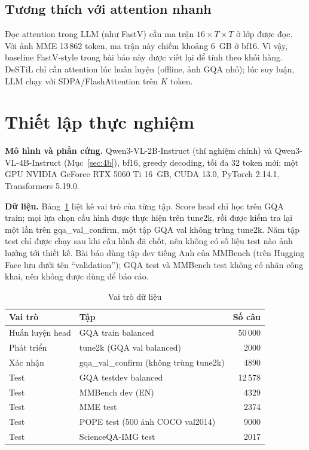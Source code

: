 \documentclass[conference]{IEEEtran}
\begin{document}
\subsection{Tương thích với attention nhanh}
Đọc attention trong LLM (như FastV) cần ma trận $16\times T\times T$ ở lớp được đọc. Với ảnh MME 13\,862 token, ma trận này chiếm khoảng 6~GB ở bf16. Vì vậy, baseline FastV-style trong bài báo này được viết lại để tính theo khối hàng. DeSTiL chỉ cần attention lúc huấn luyện (offline, ảnh GQA nhỏ); lúc suy luận, LLM chạy với SDPA/FlashAttention trên $K$ token.

\section{Thiết lập thực nghiệm}
\label{sec:setup}

\textbf{Mô hình và phần cứng.} Qwen3-VL-2B-Instruct (thí nghiệm chính) và Qwen3-VL-4B-Instruct (Mục~\ref{sec:4b}), bf16, greedy decoding, tối đa 32 token mới; một GPU NVIDIA GeForce RTX 5060 Ti 16~GB, CUDA 13.0, PyTorch 2.14.1, Transformers 5.19.0.

\textbf{Dữ liệu.} Bảng~\ref{tab:data} liệt kê vai trò của từng tập. Score head chỉ học trên GQA train; mọi lựa chọn cấu hình được thực hiện trên tune2k, rồi được kiểm tra lại một lần trên gqa\_val\_confirm, một tập GQA val không trùng tune2k. Năm tập test chỉ được chạy sau khi cấu hình đã chốt, nên không có số liệu test nào ảnh hưởng tới thiết kế. Bài báo dùng tập dev tiếng Anh của MMBench (trên Hugging Face lưu dưới tên ``validation''); GQA test và MMBench test không có nhãn công khai, nên không được dùng để báo cáo.

\begin{table}[!t]
\centering
\caption{Vai trò dữ liệu}
\label{tab:data}
\begin{tabular}{@{}llr@{}}
\toprule
Vai trò & Tập & Số câu\\
\midrule
Huấn luyện head & GQA train balanced & 50\,000\\
Phát triển & tune2k (GQA val balanced) & 2000\\
Xác nhận & gqa\_val\_confirm (không trùng tune2k) & 4890\\
Test & GQA testdev balanced & 12\,578\\
Test & MMBench dev (EN) & 4329\\
Test & MME test & 2374\\
Test & POPE test (500 ảnh COCO val2014) & 9000\\
Test & ScienceQA-IMG test & 2017\\
\bottomrule
\end{tabular}
\end{table}
\end{document}
